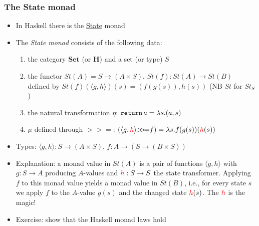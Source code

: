 \documentclass[handout]{beamer}
\newcommand{\bfsf}[1]{{\boldsymbol{#1}}}
\newcommand{\Set}{\bfsf{Set}}
\newcommand{\HH}{\bfsf{H}}
\newcommand{\Kp}[1]{{\langle #1 \rangle}}
\newcommand{\bind}{{>}\!\!{>}\!{=}}
\newcommand{\ttt}[1]{\text{\tt #1}}
\begin{document}
\frame
  {   
    \frametitle{The State monad}\label{Mon5:MonadState}

 \begin{itemize}[<+->]
\item In Haskell there is the 
\href{https://wiki.haskell.org/All_About_Monads\#The_State\_monad}%
{\color{blue}State} monad
\item The \emph{State monad} consists of the following data:
 \begin{enumerate}
    \item the category $\Set$ (or $\HH$) and a set (or type) $S$
    \item the functor $St(A) = S \to (A\times S)$, $St(f) : St(A)\to St(B)$ defined by
$St(f)(\Kp{g,h})(s) = (f(g(s)),h(s))$ (NB $St$ for $St_S$)%
    \item the natural transformation $\eta$: $\ttt{return}\,a = \lambda s. (a,s)$
    \item $\mu$ defined through $\bind$:
$(\Kp{g,{\color{red}h}} \bind f ) =  \lambda s. f(g(s))({\color{red}h}(s))$
 \end{enumerate}
\item Types: $\Kp{g,h}: S \to (A\times S)$, $f: A\to (S \to (B\times S))$ 
\item Explanation: a monad value in $St(A)$ is a pair of functions  $\Kp{g,h}$
with $g:S\to A$ producing $A$-values and ${\color{red}h}:S\to S$ the state transformer.
Applying $f$ to this monad value yields a monad value in $St(B)$, i.e.,
for every state $s$ we apply $f$ to the $A$-value $g(s)$ and 
the changed state ${\color{red}h}(s)$. The ${\color{red}h}$ is the magic!
\item Exercise: show that the Haskell monad laws hold
 \end{itemize}

 }
\end{document}
